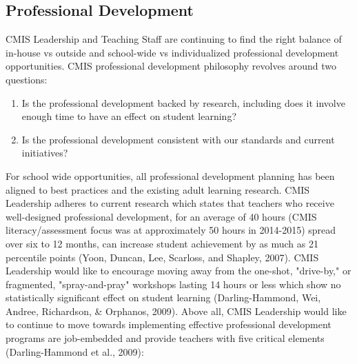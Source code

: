 \subsection{Professional Development}



\begin{findings}
CMIS Leadership and Teaching Staff are continuing to find the right balance of in-house vs outside and school-wide vs  individualized professional development opportunities. CMIS professional development philosophy revolves around two questions:

\begin{enumerate}
\item Is the professional development backed by research, including does it involve enough time to have an effect on student learning?
\item Is the professional development consistent with our standards and current initiatives? 
\end{enumerate}


For school wide opportunities, all professional development planning has been aligned to best practices and the existing adult learning research. CMIS Leadership adheres to current research which states that teachers who receive well-designed professional development, for an average of 40 hours (CMIS literacy/assessment focus was at approximately 50 hours in 2014-2015) spread over six to 12 months, can increase student achievement by as much as 21 percentile points (Yoon, Duncan, Lee, Scarloss, and Shapley, 2007). CMIS Leadership would like to encourage moving away from the one-shot, "drive-by," or fragmented, "spray-and-pray" workshops lasting 14 hours or less which show no statistically significant effect on student learning (Darling-Hammond, Wei, Andree, Richardson, \& Orphanos, 2009). Above all, CMIS Leadership would like to continue to move towards implementing effective professional development programs are job-embedded and provide teachers with five critical elements (Darling-Hammond et al., 2009):


\end{findings}
